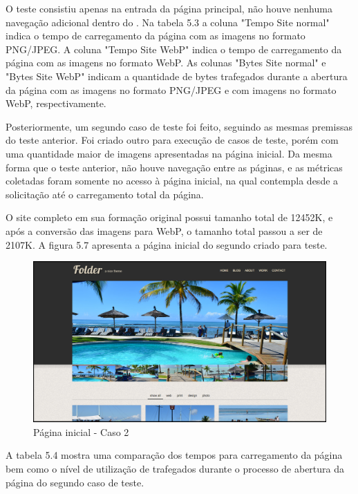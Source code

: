\documentclass[espaco=simples,appendix=Name]{abnt}
\begin{document}
O teste consistiu apenas na entrada da página principal, não houve nenhuma navegação adicional dentro do . Na tabela 5.3 a coluna "Tempo Site normal" indica o tempo de carregamento da página com as imagens no formato PNG/JPEG. A coluna "Tempo Site WebP" indica o tempo de carregamento da página com as imagens no formato WebP. As colunas "Bytes Site normal" e "Bytes Site WebP" indicam a quantidade de bytes trafegados durante a abertura da página com as imagens no formato PNG/JPEG e com imagens no formato WebP, respectivamente.

Posteriormente, um segundo caso de teste foi feito, seguindo as mesmas premissas do teste anterior. Foi criado outro  para execução de casos de teste, porém com uma quantidade maior de imagens apresentadas na página inicial. Da mesma forma que o teste anterior, não houve navegação entre as páginas, e as métricas coletadas foram somente no acesso à página inicial, na qual contempla desde a solicitação até o carregamento total da página. 

O site completo em sua formação original possui tamanho total de 12452K, e após a conversão das imagens para WebP, o tamanho total passou a ser de 2107K. A figura 5.7 apresenta a página inicial do segundo  criado para teste.

\begin{figure}[H]
  \centering
    \includegraphics[scale=0.25]{site2.png}
  \caption{Página inicial - Caso 2}
\end{figure}

A tabela 5.4 mostra uma comparação dos tempos para carregamento da página bem como o nível de utilização de  trafegados durante o processo de abertura da página do segundo caso de teste.
\end{document}
